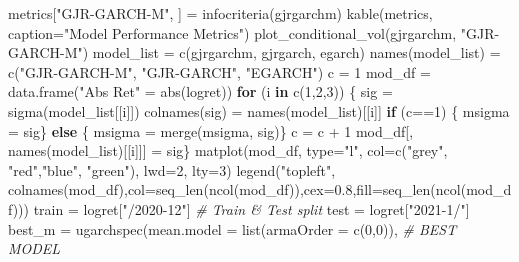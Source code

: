 \documentclass[
  11pt,
]{article}
\newenvironment{Shaded}{\begin{snugshade}}{\end{snugshade}}
\newcommand{\AttributeTok}[1]{\textcolor[rgb]{0.77,0.63,0.00}{#1}}
\newcommand{\CommentTok}[1]{\textcolor[rgb]{0.56,0.35,0.01}{\textit{#1}}}
\newcommand{\ControlFlowTok}[1]{\textcolor[rgb]{0.13,0.29,0.53}{\textbf{#1}}}
\newcommand{\DecValTok}[1]{\textcolor[rgb]{0.00,0.00,0.81}{#1}}
\newcommand{\FloatTok}[1]{\textcolor[rgb]{0.00,0.00,0.81}{#1}}
\newcommand{\FunctionTok}[1]{\textcolor[rgb]{0.00,0.00,0.00}{#1}}
\newcommand{\NormalTok}[1]{#1}
\newcommand{\OtherTok}[1]{\textcolor[rgb]{0.56,0.35,0.01}{#1}}
\newcommand{\SpecialCharTok}[1]{\textcolor[rgb]{0.00,0.00,0.00}{#1}}
\newcommand{\StringTok}[1]{\textcolor[rgb]{0.31,0.60,0.02}{#1}}
\begin{document}
\begin{Shaded}
\begin{Highlighting}[]
\NormalTok{metrics[}\StringTok{"GJR{-}GARCH{-}M"}\NormalTok{, ] }\OtherTok{=}  \FunctionTok{infocriteria}\NormalTok{(gjrgarchm)}
\FunctionTok{kable}\NormalTok{(metrics, }\AttributeTok{caption=}\StringTok{"Model Performance Metrics"}\NormalTok{)}
\FunctionTok{plot\_conditional\_vol}\NormalTok{(gjrgarchm, }\StringTok{"GJR{-}GARCH{-}M"}\NormalTok{)}
\NormalTok{model\_list }\OtherTok{=} \FunctionTok{c}\NormalTok{(gjrgarchm, gjrgarch, egarch)}
\FunctionTok{names}\NormalTok{(model\_list) }\OtherTok{=} \FunctionTok{c}\NormalTok{(}\StringTok{"GJR{-}GARCH{-}M"}\NormalTok{, }\StringTok{"GJR{-}GARCH"}\NormalTok{, }\StringTok{"EGARCH"}\NormalTok{)}
\NormalTok{c }\OtherTok{=} \DecValTok{1}
\NormalTok{mod\_df }\OtherTok{=} \FunctionTok{data.frame}\NormalTok{(}\StringTok{"Abs Ret"} \OtherTok{=} \FunctionTok{abs}\NormalTok{(logret))}
\ControlFlowTok{for}\NormalTok{ (i }\ControlFlowTok{in} \FunctionTok{c}\NormalTok{(}\DecValTok{1}\NormalTok{,}\DecValTok{2}\NormalTok{,}\DecValTok{3}\NormalTok{)) \{}
\NormalTok{    sig }\OtherTok{=} \FunctionTok{sigma}\NormalTok{(model\_list[[i]])}
    \FunctionTok{colnames}\NormalTok{(sig) }\OtherTok{=} \FunctionTok{names}\NormalTok{(model\_list)[[i]]}
    \ControlFlowTok{if}\NormalTok{ (c}\SpecialCharTok{==}\DecValTok{1}\NormalTok{) \{}
\NormalTok{      msigma }\OtherTok{=}\NormalTok{ sig\} }\ControlFlowTok{else}\NormalTok{ \{}
\NormalTok{        msigma }\OtherTok{=} \FunctionTok{merge}\NormalTok{(msigma, sig)\} }
\NormalTok{  c }\OtherTok{=}\NormalTok{ c }\SpecialCharTok{+} \DecValTok{1}
\NormalTok{  mod\_df[, }\FunctionTok{names}\NormalTok{(model\_list)[[i]]] }\OtherTok{=}\NormalTok{ sig\}}
\FunctionTok{matplot}\NormalTok{(mod\_df, }\AttributeTok{type=}\StringTok{"l"}\NormalTok{, }\AttributeTok{col=}\FunctionTok{c}\NormalTok{(}\StringTok{"grey"}\NormalTok{, }\StringTok{"red"}\NormalTok{,}\StringTok{"blue"}\NormalTok{, }\StringTok{"green"}\NormalTok{), }\AttributeTok{lwd=}\DecValTok{2}\NormalTok{, }\AttributeTok{lty=}\DecValTok{3}\NormalTok{)}
\FunctionTok{legend}\NormalTok{(}\StringTok{"topleft"}\NormalTok{, }\FunctionTok{colnames}\NormalTok{(mod\_df),}\AttributeTok{col=}\FunctionTok{seq\_len}\NormalTok{(}\FunctionTok{ncol}\NormalTok{(mod\_df)),}\AttributeTok{cex=}\FloatTok{0.8}\NormalTok{,}\AttributeTok{fill=}\FunctionTok{seq\_len}\NormalTok{(}\FunctionTok{ncol}\NormalTok{(mod\_df)))}
\NormalTok{train }\OtherTok{=}\NormalTok{ logret[}\StringTok{"/2020{-}12"}\NormalTok{] }\CommentTok{\# Train \& Test split}
\NormalTok{test }\OtherTok{=}\NormalTok{ logret[}\StringTok{"2021{-}1/"}\NormalTok{]}
\NormalTok{best\_m }\OtherTok{=} \FunctionTok{ugarchspec}\NormalTok{(}\AttributeTok{mean.model =} \FunctionTok{list}\NormalTok{(}\AttributeTok{armaOrder =} \FunctionTok{c}\NormalTok{(}\DecValTok{0}\NormalTok{,}\DecValTok{0}\NormalTok{)), }\CommentTok{\# BEST MODEL}

\end{Highlighting}
\end{Shaded}
\end{document}
